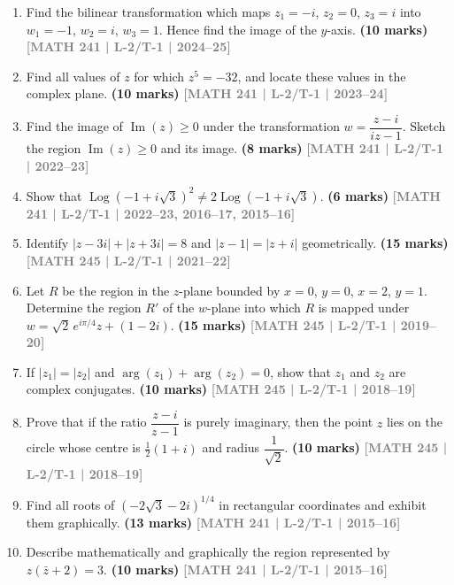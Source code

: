 \documentclass[12pt,a3paper]{article}
\newcommand{\yr}[1]{\hfill\textcolor{gray}{\small\textbf{[#1]}}}
\newcommand{\mk}[1]{\textcolor{orange!70!black}{\small\textbf{(#1 marks)}}}
\begin{document}
\begin{enumerate}
    
\item Find the bilinear transformation which maps $z_{1}=-i$, $z_{2}=0$, $z_{3}=i$ into $w_{1}=-1$, $w_{2}=i$, $w_{3}=1$. Hence find the image of the $y$-axis.
\mk{10} \yr{MATH 241 | L-2/T-1 | 2024--25}


\item Find all values of $z$ for which $z^{5}=-32$, and locate these values in the complex plane.
\mk{10} \yr{MATH 241 | L-2/T-1 | 2023--24}


\item Find the image of $\operatorname{Im}(z)\ge 0$ under the transformation $w=\dfrac{z-i}{iz-1}$. Sketch the region $\operatorname{Im}(z)\ge 0$ and its image.
\mk{8} \yr{MATH 241 | L-2/T-1 | 2022--23}


\item Show that $\operatorname{Log}(-1+i\sqrt{3})^{2}\neq 2\operatorname{Log}(-1+i\sqrt{3})$.
\mk{6} \yr{MATH 241 | L-2/T-1 | 2022--23, 2016--17, 2015--16}



\item Identify $|z-3i|+|z+3i|=8$ and $|z-1|=|z+i|$ geometrically.
\mk{15} \yr{MATH 245 | L-2/T-1 | 2021--22}

\item Let $R$ be the region in the $z$-plane bounded by $x=0$, $y=0$, $x=2$, $y=1$. Determine the region $R'$ of the $w$-plane into which $R$ is mapped under $w=\sqrt{2}\,e^{i\pi/4}z+(1-2i)$.
\mk{15} \yr{MATH 245 | L-2/T-1 | 2019--20}


\item If $|z_{1}|=|z_{2}|$ and $\arg(z_{1})+\arg(z_{2})=0$, show that $z_{1}$ and $z_{2}$ are complex conjugates.
\mk{10} \yr{MATH 245 | L-2/T-1 | 2018--19}


\item Prove that if the ratio $\dfrac{z-i}{z-1}$ is purely imaginary, then the point $z$ lies on the circle whose centre is $\tfrac{1}{2}(1+i)$ and radius $\dfrac{1}{\sqrt{2}}$.
\mk{10} \yr{MATH 245 | L-2/T-1 | 2018--19}


\item Find all roots of $(-2\sqrt{3}-2i)^{1/4}$ in rectangular coordinates and exhibit them graphically.
\mk{13} \yr{MATH 241 | L-2/T-1 | 2015--16}


\item Describe mathematically and graphically the region represented by $z(\bar{z}+2)=3$.
\mk{10} \yr{MATH 241 | L-2/T-1 | 2015--16}



\end{enumerate}
\end{document}

